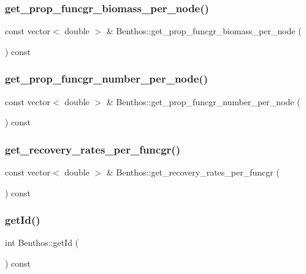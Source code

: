 \subsubsection{\texorpdfstring{get\_prop\_funcgr\_biomass\_per\_node()}{get\_prop\_funcgr\_biomass\_per\_node()}}
{\footnotesize\ttfamily const vector$<$ double $>$ \& Benthos\+::get\+\_\+prop\+\_\+funcgr\+\_\+biomass\+\_\+per\+\_\+node (\begin{DoxyParamCaption}{ }\end{DoxyParamCaption}) const}

\mbox{\label{class_benthos_a7f8007882d4f950f6037e5fb57a316af}} 
\subsubsection{\texorpdfstring{get\_prop\_funcgr\_number\_per\_node()}{get\_prop\_funcgr\_number\_per\_node()}}
{\footnotesize\ttfamily const vector$<$ double $>$ \& Benthos\+::get\+\_\+prop\+\_\+funcgr\+\_\+number\+\_\+per\+\_\+node (\begin{DoxyParamCaption}{ }\end{DoxyParamCaption}) const}

\mbox{\label{class_benthos_ac04ce2803897d9f3f6ab54ba14a88124}} 
\subsubsection{\texorpdfstring{get\_recovery\_rates\_per\_funcgr()}{get\_recovery\_rates\_per\_funcgr()}}
{\footnotesize\ttfamily const vector$<$ double $>$ \& Benthos\+::get\+\_\+recovery\+\_\+rates\+\_\+per\+\_\+funcgr (\begin{DoxyParamCaption}{ }\end{DoxyParamCaption}) const}

\mbox{\label{class_benthos_a5aa8261a598fdaab9d85bc4922e1c073}} 
\subsubsection{\texorpdfstring{getId()}{getId()}}
{\footnotesize\ttfamily int Benthos\+::get\+Id (\begin{DoxyParamCaption}{ }\end{DoxyParamCaption}) const\hspace{0.3cm}{\ttfamily [inline]}}


